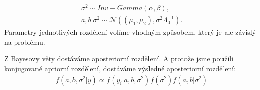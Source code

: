 \documentclass[czech,master,public,dept470,male,cpdeclaration,oneside, python]{diploma}
\begin{document}
\begin{align}
	\sigma^2 \sim Inv-Gamma(\alpha, \beta), \\
	a, b | \sigma^2 \sim \mathcal{N}((\mu_1, \mu_2), \sigma^2\Lambda_0^{-1}).
\end{align}
Parametry jednotlivých rozdělení volíme vhodným způsobem, který je ale závislý na problému. \par
Z Bayesovy věty dostáváme aposteriorní rozdělení. A protože jsme použili konjugované apriorní rozdělení, dostáváme výsledné aposteriorní rozdělení:
\begin{align}
	f(a, b, \sigma^2 | y) \propto f(y_i | a, b, \sigma^2)f(\sigma^2)f(a,b | \sigma^2)
\end{align}
\end{document}
